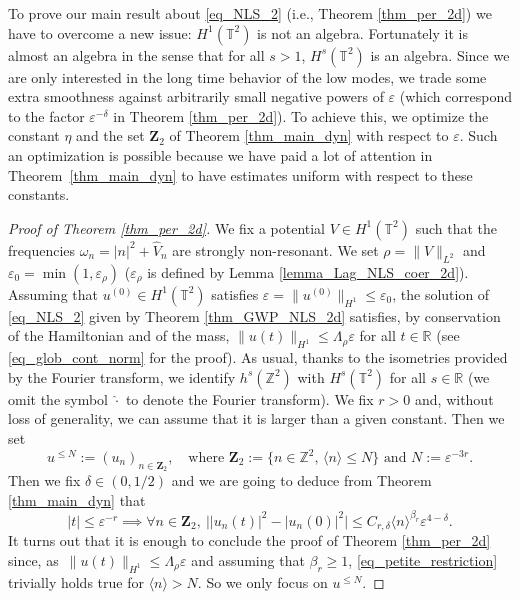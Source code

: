 \documentclass[11pt]{article}
\newcommand{\ie}{i.e.,\xspace}
\let\epsilon\varepsilon
\theoremstyle{definition}
\begin{document}
To prove our main result about \eqref{eq_NLS_2} (\ie Theorem \ref{thm_per_2d}) we have to overcome a new issue: $H^1(\mathbb{T}^2)$ is not an algebra. Fortunately it is almost an algebra in the sense that for all $s>1$, $H^s(\mathbb{T}^2)$ is an algebra. Since we are only interested in the long time behavior of the low modes, we trade some extra smoothness against arbitrarily small negative powers of $\varepsilon$ (which correspond to the factor $\varepsilon^{-\delta}$ in Theorem \ref{thm_per_2d}). To achieve this, we optimize the constant $\eta$ and the set $\mathbf{Z}_2$ of Theorem \ref{thm_main_dyn} with respect to $\varepsilon$. Such an optimization is possible because we have paid a lot of attention in Theorem~\ref{thm_main_dyn} to have estimates uniform with respect to these constants.

\begin{proof}[Proof of Theorem \ref{thm_per_2d}] We fix a potential $V\in H^1(\mathbb{T}^2)$ such that the frequencies $\omega_n = |n|^2 + \widehat{V}_n$ are strongly non-resonant. We set $\rho = \|V\|_{L^2}$ and $\epsilon_0 = \min(1,\varepsilon_{\rho})$ ($\varepsilon_{\rho}$ is defined by Lemma \ref{lemma_Lag_NLS_coer_2d}). Assuming that $u^{(0)}\in H^1(\mathbb{T}^2)$ satisfies $\varepsilon = \| u^{(0)} \|_{H^1} \leq \epsilon_0$, the solution of \eqref{eq_NLS_2} given by Theorem \ref{thm_GWP_NLS_2d} satisfies, by conservation of the Hamiltonian and of the mass, $\| u(t) \|_{H^1}\leq \Lambda_\rho \varepsilon$ for all $t\in \mathbb{R}$ (see \eqref{eq_glob_cont_norm} for the proof). As usual, thanks to the isometries provided by the Fourier transform, we identify $h^s(\mathbb{Z}^2)$ with $H^s(\mathbb{T}^2)$ for all $s\in \mathbb{R}$ (we omit the symbol $\widehat{\cdot}$ to denote the Fourier transform). We fix $r>0$ and, without loss of generality, we can assume that it is larger than a given constant. Then we set
\[
u^{\leq N}:= (u_n)_{n\in \mathbf{Z}_2}, \quad \text{where } \mathbf{Z}_2:= \{ n \in\mathbb{Z}^2, \, \langle n \rangle \leq N\} \text{ and } N:= \varepsilon^{-3r}.
\]
Then we fix $\delta\in (0,1/2)$ and we are going to deduce from Theorem \ref{thm_main_dyn} that
\begin{equation}
\label{eq_petite_restriction}
|t| \leq \varepsilon^{-r} \implies \forall n \in \mathbf{Z}_2, \ \bigl||u_n(t)|^2 - |u_n(0)|^2 \bigr| \leq C_{r,\delta} \langle n \rangle^{\beta_r} \varepsilon^{4-\delta}.
\end{equation}
It turns out that it is enough to conclude the proof of Theorem \ref{thm_per_2d} since, as~$\|u(t)\|_{H^1} \leq \Lambda_\rho \varepsilon$ and assuming that $\beta_r\geq 1$, \eqref{eq_petite_restriction} trivially holds true for $\langle n \rangle > N$. So we only focus on $u^{\leq N}$.


\end{proof}
\end{document}
